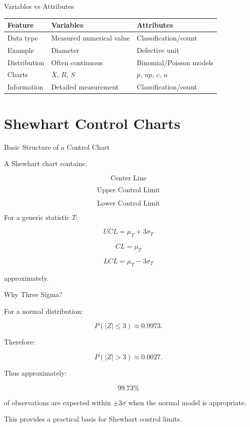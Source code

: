 \documentclass[aspectratio=169,10pt]{beamer}
\begin{document}

\begin{frame}[shrink=18]{Variables vs Attributes}
\small

\begin{tabularx}{\textwidth}{YYY}
\toprule
Feature & Variables & Attributes\\
\midrule
Data type & Measured numerical value & Classification/count\\
Example & Diameter & Defective unit\\
Distribution & Often continuous & Binomial/Poisson models\\
Charts & $\bar X$, $R$, $S$ & $p$, $np$, $c$, $u$\\
Information & Detailed measurement & Classification/count\\
\bottomrule
\end{tabularx}

\end{frame}


\section{Shewhart Control Charts}

\begin{frame}[shrink=18]{Basic Structure of a Control Chart}
\small

A Shewhart chart contains:

\[
\boxed{\text{Center Line}}
\]

\[
\boxed{\text{Upper Control Limit}}
\]

\[
\boxed{\text{Lower Control Limit}}
\]

For a generic statistic \(T\):

\[
UCL=\mu_T+3\sigma_T
\]

\[
CL=\mu_T
\]

\[
LCL=\mu_T-3\sigma_T
\]

approximately.

\end{frame}


\begin{frame}[shrink=18]{Why Three Sigma?}
\small

For a normal distribution:

\[
P(|Z|\le3)\approx0.9973.
\]

Therefore:

\[
P(|Z|>3)\approx0.0027.
\]

Thus approximately:

\[
99.73\%
\]

of observations are expected within \(\pm3\sigma\) when the
normal model is appropriate.

This provides a practical basis for Shewhart control limits.

\end{frame}
\end{document}
